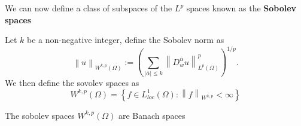 \documentclass[../Main/main.tex]{subfiles}
\begin{document}
	
	We can now define a class of subspaces of the $L^p$ spaces known as the \textbf{Sobolev spaces}
	\begin{definition}
		Let $k$ be a non-negative integer, define the Sobolev norm as 
		\begin{equation*}
			\left \| u \right \|_{W^{k,p}(\Omega)} := (\sum_{|\overline{\alpha}| \leq k} \left \| D_w^{\overline{\alpha}}u \right \|_{L^p(\Omega)}^p)^{1/p}.
		\end{equation*}
		We then define the sovolev spaces as 
		\begin{equation*}
			W^{k,p}(\Omega) = \left \{  \right. f\in L^1_{loc}(\Omega):\left \| f \right \|_{W^{k,p}}<\infty\left.  \right \}
		\end{equation*}
	\end{definition}
	\begin{theorem}
		The sobolev spaces $W^{k,p}(\Omega)$ are Banach spaces
	\end{theorem}
	
\end{document}

